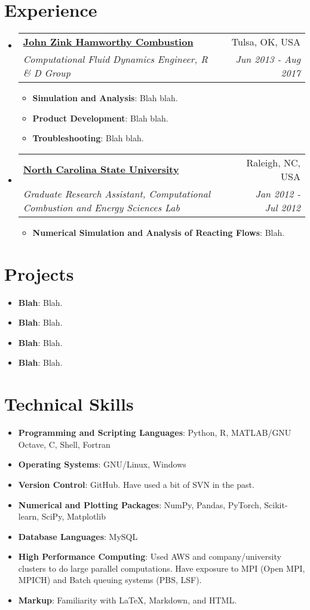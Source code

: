 \documentclass[letterpaper,11pt]{article}
\makeatletter
\newcommand{\resumeItem}[2]{
	\item\small{
		\textbf{#1}{: #2 \vspace{-2pt}}
	}
}
\newcommand{\resumeSubheading}[4]{
	\vspace{-1pt}\item
	\begin{tabular*}{0.97\textwidth}[t]{l@{\extracolsep{\fill}}r}
		\textbf{#1} & #2 \\
		\textit{\small#3} & \textit{\small #4} \\
	\end{tabular*}\vspace{-5pt}
}
\newcommand{\resumeSubItem}[2]{\resumeItem{#1}{#2}\vspace{-4pt}}
\newcommand{\resumeSubHeadingListStart}{\begin{itemize}[leftmargin=*]}
\newcommand{\resumeSubHeadingListEnd}{\end{itemize}}
\newcommand{\resumeItemListStart}{\begin{itemize}}
\newcommand{\resumeItemListEnd}{\end{itemize}\vspace{-5pt}}
\makeatother
\begin{document}
	\section{Experience}
	\resumeSubHeadingListStart
	
	\resumeSubheading
	{\href{https://www.johnzinkhamworthy.com/}{John Zink Hamworthy Combustion}}{Tulsa, OK, USA}
	{Computational Fluid Dynamics Engineer, R \& D Group}{Jun 2013 - Aug 2017}
	\resumeItemListStart
	\resumeItem{Simulation and Analysis}
	{Blah blah.}
	\resumeItem{Product Development}
	{Blah blah.}
	\resumeItem{Troubleshooting}
	{Blah blah.}
	\resumeItemListEnd
	
	\resumeSubheading
	{\href{https://www.mae.ncsu.edu/research/facilities-and-labs/}{North Carolina State University}}{Raleigh, NC, USA}
	{Graduate Research Assistant, Computational Combustion and Energy Sciences Lab}{Jan 2012 - Jul 2012}
	\resumeItemListStart
	\resumeItem{Numerical Simulation and Analysis of Reacting Flows}
	{Blah.}
	\resumeItemListEnd	
	\resumeSubHeadingListEnd
	
	\section{Projects}
	\resumeSubHeadingListStart
	\resumeSubItem{Blah}
	{Blah.}
	\resumeSubItem{Blah}
	{Blah.}
	\resumeSubItem{Blah}
	{Blah.}
	\resumeSubItem{Blah}
	{Blah.}
	\resumeSubHeadingListEnd
	
	\section{Technical Skills}
	\resumeSubHeadingListStart
	\resumeSubItem{Programming and Scripting Languages}
	{Python, R, MATLAB/GNU Octave, C, Shell, Fortran}
	\resumeSubItem{Operating Systems}
	{GNU/Linux, Windows}
	\resumeSubItem{Version Control}
	{GitHub. Have used a bit of SVN in the past.}
	\resumeSubItem{Numerical and Plotting Packages}
	{NumPy, Pandas, PyTorch, Scikit-learn, SciPy, Matplotlib}
	\resumeSubItem{Database Languages}
	{MySQL}
	\resumeSubItem{High Performance Computing}
	{Used AWS and company/university clusters to do large parallel computations. Have exposure to MPI (Open MPI, MPICH) and Batch queuing systems (PBS, LSF).}
	\resumeSubItem{Markup}
	{Familiarity with \LaTeX, Markdown, and HTML.}
	\resumeSubHeadingListEnd
	
\end{document}
